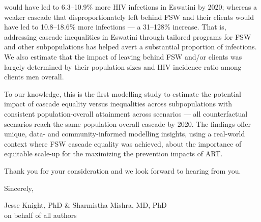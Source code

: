 would have led to 6.3--10.9\% more HIV infections in Eswatini by 2020;
whereas a weaker cascade that disproportionately left behind FSW and their clients
would have led to 10.8--18.6\% more infections
--- a 31--128\% increase.
That is, addressing cascade inequalities in Eswatini
through tailored programs for FSW and other subpopulations
has helped avert a substantial proportion of infections.
We also estimate that the impact of
leaving behind FSW and/or clients was largely determined by
their population sizes and HIV incidence ratio among clients \vs men overall.
\par
To our knowledge, this is the first modelling study to estimate
the potential impact of cascade equality versus inequalities across subpopulations
with consistent population-overall attainment across scenarios ---
\ie all counterfactual scenarios reach the same population-overall cascade by 2020.
The findings offer unique, data- and community-informed modelling insights,
using a real-world context where FSW cascade equality was achieved,
about the importance of equitable scale-up
for the maximizing the prevention impacts of ART.
\par
Thank you for your consideration and we look forward to hearing from you.
\medskip\par
Sincerely,
\par
Jesse Knight, PhD \& Sharmistha Mishra, MD, PhD\\
on behalf of all authors
\restoregeometry%
